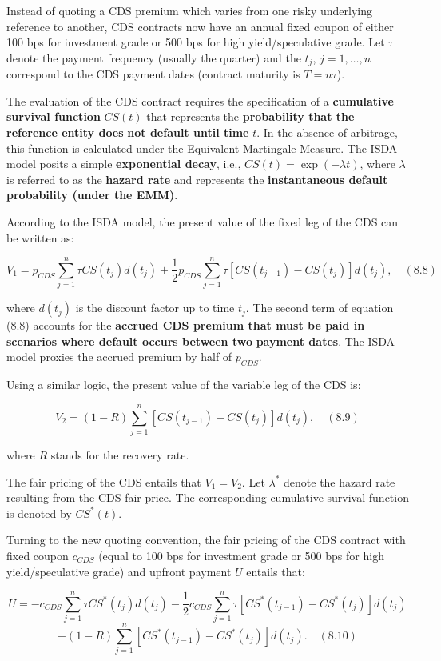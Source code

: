 \documentclass[12pt,a4paper]{article}
\begin{document}
Instead of quoting a CDS premium which varies from one risky underlying reference to another, CDS contracts now have an annual fixed coupon of either 100 bps for investment grade or 500 bps for high yield/speculative grade. Let $\tau$ denote the payment frequency (usually the quarter) and the $t_j$, $j = 1, \ldots, n$ correspond to the CDS payment dates (contract maturity is $T = n\tau$).

The evaluation of the CDS contract requires the specification of a \textbf{cumulative survival function} $CS(t)$ that represents the \textbf{probability that the reference entity does} \textbf{not default until time} $t$. In the absence of arbitrage, this function is calculated under the Equivalent Martingale Measure. The ISDA model posits a simple \textbf{exponential decay}, i.e., $CS(t) = \exp(-\lambda t)$, where $\lambda$ is referred to as the \textbf{hazard rate} and represents the \textbf{instantaneous default probability (under the EMM)}.

According to the ISDA model, the present value of the fixed leg of the CDS can be written as:

$$V_1 = p_{CDS} \sum_{j=1}^{n} \tau CS(t_j)d(t_j) + \frac{1}{2}p_{CDS} \sum_{j=1}^{n} \tau [CS(t_{j-1}) - CS(t_j)]d(t_j), \quad (8.8)$$

where $d(t_j)$ is the discount factor up to time $t_j$. The second term of equation (8.8) accounts for the \textbf{accrued CDS premium that must be paid in scenarios where default occurs between two} \textbf{payment dates}. The ISDA model proxies the accrued premium by half of $p_{CDS}$.

Using a similar logic, the present value of the variable leg of the CDS is:

$$V_2 = (1-R) \sum_{j=1}^{n} [CS(t_{j-1}) - CS(t_j)]d(t_j), \quad (8.9)$$

where $R$ stands for the recovery rate.

The fair pricing of the CDS entails that $V_1 = V_2$. Let $\lambda^*$ denote the hazard rate resulting from the CDS fair price. The corresponding cumulative survival function is denoted by $CS^*(t)$.

Turning to the new quoting convention, the fair pricing of the CDS contract with fixed coupon $c_{CDS}$ (equal to 100 bps for investment grade or 500 bps for high yield/speculative grade) and upfront payment $U$ entails that:

$$U = -c_{CDS} \sum_{j=1}^{n} \tau CS^*(t_j)d(t_j) - \frac{1}{2} c_{CDS} \sum_{j=1}^{n} \tau [CS^*(t_{j-1}) - CS^*(t_j)]d(t_j)$$
$$+ (1 - R) \sum_{j=1}^{n} [CS^*(t_{j-1}) - CS^*(t_j)]d(t_j). \quad (8.10)$$
\end{document}
